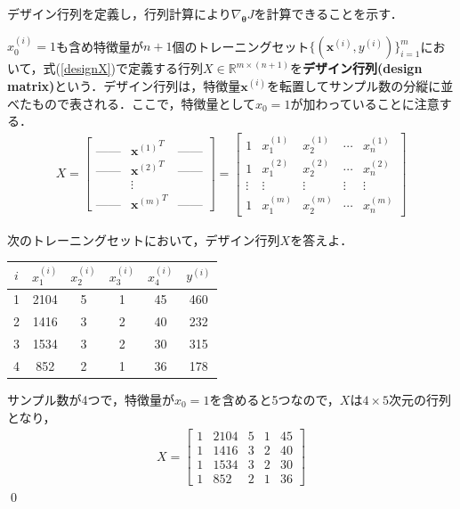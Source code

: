 デザイン行列を定義し，行列計算により$\nabla_{{\bm \theta}}J$を計算できることを示す．

\begin{defi}[デザイン行列]
$x_0^{(i)}=1$も含め特徴量が$n+1$個のトレーニングセット$\{({\bm x}^{(i)},y^{(i)})\}_{i=1}^m$において，式(\ref{designX})で定義する行列$X \in \mathbb{R}^{m\times (n+1)}$を{\bf デザイン行列(design matrix)}という．デザイン行列は，特徴量${\bm x}^{(i)}$を転置してサンプル数の分縦に並べたもので表される．ここで，特徴量として$x_0=1$が加わっていることに注意する．
\begin{align}
X = 
\begin{bmatrix}
\mbox{------} & {{\bm x}^{(1)}}^T & \mbox{------} \\
\mbox{------} & {{\bm x}^{(2)}}^T & \mbox{------} \\
 & \vdots & \\
\mbox{------} & {{\bm x}^{(m)}}^T & \mbox{------}
\end{bmatrix}
=
\begin{bmatrix}
1 & x_1^{(1)} & x_2^{(1)} & \cdots & x_n^{(1)} \\
1 & x_1^{(2)} & x_2^{(2)} & \cdots & x_n^{(2)} \\
\vdots & \vdots & \vdots & \vdots & \vdots \\
1 & x_1^{(m)} & x_2^{(m)} & \cdots & x_n^{(m)} 
\end{bmatrix} \label{designX}
\end{align}
\end{defi}

\begin{qu}
次のトレーニングセットにおいて，デザイン行列$X$を答えよ．
\begin{table}[H]
\centering
\begin{tabular}{cccccc}
\hline
$i$ &$x_1^{(i)}$ &$x_2^{(i)}$ &$x_3^{(i)}$ &$x_4^{(i)}$ & $y^{(i)}$ \\ \hline
1 & 2104 & 5 & 1 & 45 & 460 \\
2 & 1416 & 3 & 2 & 40 & 232 \\
3 & 1534 & 3 & 2 & 30 & 315 \\
4 & 852  & 2 & 1 & 36 & 178 \\ \hline
\end{tabular}
\end{table}
\end{qu}
\begin{ans}
サンプル数が4つで，特徴量が$x_0=1$を含めると5つなので，$X$は$4\times 5$次元の行列となり，
\begin{align*}
X=
\begin{bmatrix}
1 & 2104 & 5 & 1 & 45 \\
1 & 1416 & 3 & 2 & 40 \\
1 & 1534 & 3 & 2 & 30 \\
1 & 852  & 2 & 1 & 36 
\end{bmatrix}
\end{align*}\qed
\end{ans}


